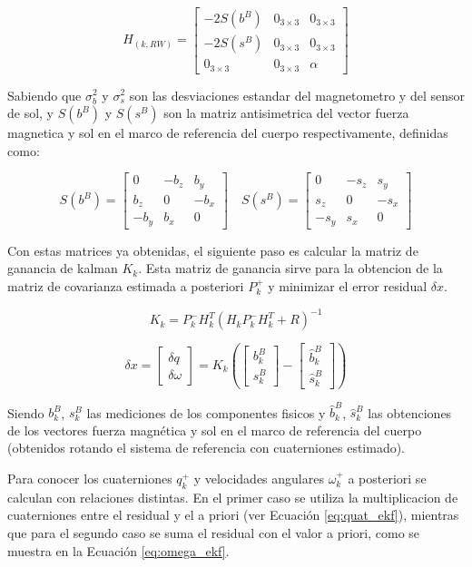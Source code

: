 \[
H_{(k,RW)} = \begin{bmatrix}
	-2S(b^B) & 0_{3 \times 3} & 0_{3 \times 3} \\
	-2S(s^B) & 0_{3 \times 3} & 0_{3 \times 3} \\
	0_{3 \times 3} & 0_{3 \times 3} & \alpha
\end{bmatrix}
\]

Sabiendo que $\sigma_b^2$ y $\sigma_s^2$ son las desviaciones estandar del magnetometro y del sensor de sol, y $S(b^{B})$ y $S(s^{B})$ son la matriz antisimetrica del vector fuerza magnetica y sol en el marco de referencia del cuerpo respectivamente, definidas como:

\[
S(b^{B}) = \begin{bmatrix}
	0 & -b_{z} & b_{y} \\
	b_{z} & 0 & -b_{x} \\
	-b_{y} & b_{x} & 0
\end{bmatrix} \quad
S(s^{B}) = \begin{bmatrix}
	0 & -s_{z} & s_{y} \\
	s_{z} & 0 & -s_{x} \\
	-s_{y} & s_{x} & 0
\end{bmatrix}
\]

Con estas matrices ya obtenidas, el siguiente paso es calcular la matriz de ganancia de kalman $K_k$. Esta matriz de ganancia sirve para la obtencion de la matriz de covarianza estimada a posteriori $P_{k}^{+}$ y minimizar el error residual $\delta x$.

\[
K_k = P_k^{-} H_k^T \left( H_k P_k^{-} H_k^T + R \right)^{-1}
\]


\[
\delta x = 
\begin{bmatrix}
	\delta q \\
	\delta \omega
\end{bmatrix}
=
K_k \left( \begin{bmatrix}
	b_k^B \\
	s_k^B
\end{bmatrix}
- \begin{bmatrix}
	\hat{b}_k^B \\
	\hat{s}_k^B
\end{bmatrix} \right)
\]

Siendo 	$b_k^B$, $s_k^B$ las mediciones de los componentes fisicos y $\hat{b}_k^B$, $\hat{s}_k^B$ las obtenciones de los vectores fuerza magnética y sol en el marco de referencia del cuerpo (obtenidos rotando el sistema de referencia con cuaterniones estimado).

Para conocer los cuaterniones $q_{k}^{+}$ y velocidades angulares $\omega_{k}^{+}$ a posteriori se calculan con relaciones distintas. En el primer caso se utiliza la multiplicacion de cuaterniones entre el residual y el a priori (ver Ecuación \ref{eq:quat_ekf}), mientras que para el segundo caso se suma el residual con el valor a priori, como se muestra en la Ecuación \ref{eq:omega_ekf}.

